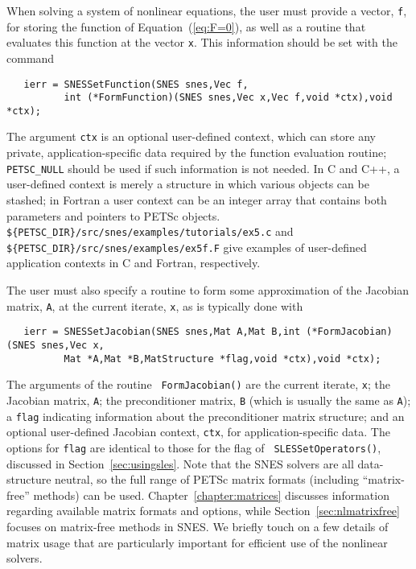 When solving a system of nonlinear equations, the user must provide
a vector, {\tt f}, for storing the function of
Equation~(\ref{eq:F=0}), as well as a routine that evaluates this
function at the vector {\tt x}.  This information should be set with
the command 
\begin{verbatim}
   ierr = SNESSetFunction(SNES snes,Vec f,
          int (*FormFunction)(SNES snes,Vec x,Vec f,void *ctx),void *ctx);
\end{verbatim}
The argument {\tt ctx} is an optional user-defined context, which can
store any private, application-specific data required by the
function evaluation routine; {\tt PETSC\_NULL} should be used if such information
is not needed.  In C and C++, a user-defined context is merely a
structure in which various objects can be stashed; in Fortran a user
context can be an integer array that contains both parameters and
pointers to PETSc objects. {\tt \$\{PETSC\_DIR\}/src/snes/examples/tutorials/ex5.c} and
{\tt \$\{PETSC\_DIR\}/src/snes/examples/ex5f.F} give examples of user-defined
application contexts in C and Fortran, respectively.

The user must also specify a routine to form some approximation of the
Jacobian matrix, {\tt A}, at the current iterate, {\tt x},
as is typically done with
\begin{verbatim}
   ierr = SNESSetJacobian(SNES snes,Mat A,Mat B,int (*FormJacobian)(SNES snes,Vec x,
          Mat *A,Mat *B,MatStructure *flag,void *ctx),void *ctx);
\end{verbatim}
The  arguments of the routine {\tt
FormJacobian()} are the current iterate, {\tt x}; the Jacobian matrix,
{\tt A}; the preconditioner matrix, {\tt B} (which is usually the same
as {\tt A}); a {\tt flag} indicating information about the
preconditioner matrix structure; and an optional user-defined Jacobian
context, {\tt ctx}, for application-specific data.  The options for
{\tt flag} are identical to those for the flag of {\tt
SLESSetOperators()}, discussed in Section~\ref{sec:usingsles}.  
Note that the SNES solvers are all data-structure neutral, so the full
range of PETSc matrix formats (including ``matrix-free''
methods) can be used.  Chapter~\ref{chapter:matrices} discusses
information regarding available matrix formats and options, while
Section~\ref{sec:nlmatrixfree} focuses on matrix-free
methods in SNES. We briefly touch on a few details of matrix usage that are
particularly important for efficient use of the nonlinear solvers.

